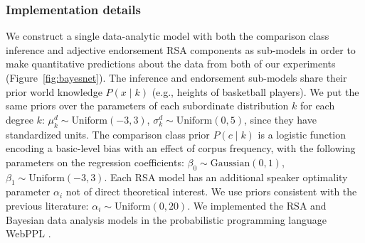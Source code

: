 \documentclass[doc]{apa6}
\begin{document}
\subsubsection{Implementation details}

We construct a single data-analytic model with both the comparison class inference and adjective endorsement RSA components as sub-models in order to make quantitative predictions about the data from both of our experiments (Figure~\ref{fig:bayesnet}).
The inference and endorsement sub-models share their prior world knowledge $P(x \mid k)$ (e.g., heights of basketball players).
We put the same priors over the parameters of each subordinate distribution $k$ for each degree $k$: $\mu^d_k \sim \text{Uniform}(-3, 3)$, $\sigma^d_k \sim \text{Uniform}(0, 5)$, since they have standardized units.
The comparison class prior $P(c \mid k)$ is a logistic function encoding a basic-level bias with an effect of corpus frequency, with the following parameters on the regression coefficients:  $\beta_0 \sim \text{Gaussian}(0, 1)$, $\beta_1 \sim \text{Uniform}(-3, 3)$. 
Each RSA model has an additional speaker optimality parameter $\alpha_{i}$ not of direct theoretical interest.
We use priors consistent with the previous literature: $\alpha_i \sim \text{Uniform}(0, 20)$.
We implemented the RSA and Bayesian data analysis models in the probabilistic programming language WebPPL \cite{dippl}.

\end{document}
